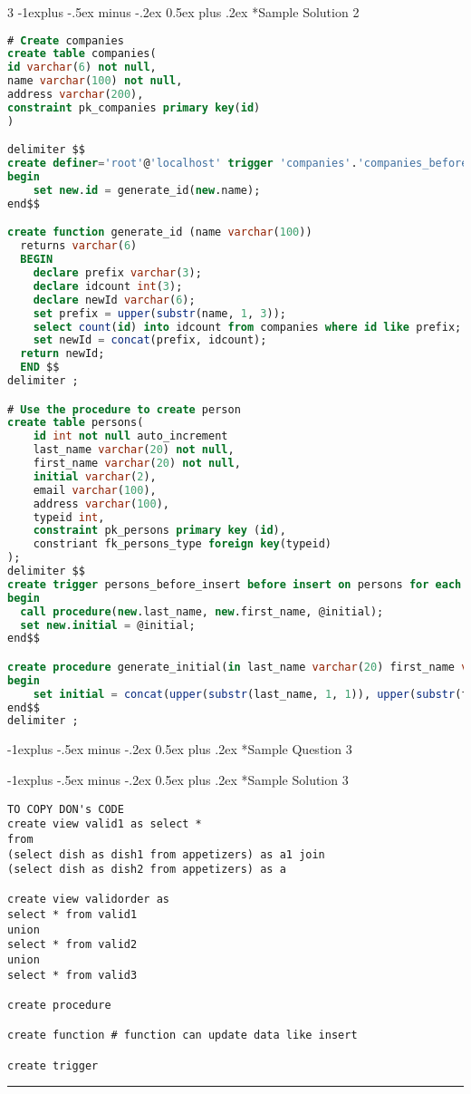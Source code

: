 \documentclass[10pt,landscape]{article}
\makeatletter
\renewcommand{\subsection}{\@startsection{subsection}{2}{0mm}%
                                {-1explus -.5ex minus -.2ex}%
                                {0.5ex plus .2ex}%
                                {\normalfont\normalsize\bfseries}}
\makeatother
\begin{document}
\begin{multicols}{3}
\subsection*{Sample Solution 2}
\begin{lstlisting}[language=SQL]
# Create companies
create table companies(
id varchar(6) not null,
name varchar(100) not null,
address varchar(200),
constraint pk_companies primary key(id)
)

delimiter $$
create definer='root'@'localhost' trigger 'companies'.'companies_before_insert' before insert on companies for each row
begin
	set new.id = generate_id(new.name);
end$$

create function generate_id (name varchar(100))
  returns varchar(6)
  BEGIN
    declare prefix varchar(3);
    declare idcount int(3);
    declare newId varchar(6);
    set prefix = upper(substr(name, 1, 3));
    select count(id) into idcount from companies where id like prefix;
    set newId = concat(prefix, idcount);
  return newId;
  END $$ 
delimiter ;

# Use the procedure to create person
create table persons(
	id int not null auto_increment
    last_name varchar(20) not null,
	first_name varchar(20) not null,
    initial varchar(2),
    email varchar(100),
    address varchar(100),
    typeid int,
    constraint pk_persons primary key (id),
    constriant fk_persons_type foreign key(typeid)
);
delimiter $$
create trigger persons_before_insert before insert on persons for each row
begin
  call procedure(new.last_name, new.first_name, @initial);
  set new.initial = @initial;
end$$

create procedure generate_initial(in last_name varchar(20) first_name varchar(20) ,out initial varchar(2))
begin
	set initial = concat(upper(substr(last_name, 1, 1)), upper(substr(first_name, 1, 1)))
end$$
delimiter ; 

\end{lstlisting}

\subsection*{Sample Question 3}

\subsection*{Sample Solution 3}
\begin{lstlisting}
TO COPY DON's CODE
create view valid1 as select *
from 
(select dish as dish1 from appetizers) as a1 join
(select dish as dish2 from appetizers) as a

create view validorder as
select * from valid1
union
select * from valid2
union 
select * from valid3

create procedure

create function # function can update data like insert

create trigger
\end{lstlisting}


\rule{0.3\linewidth}{0.25pt}
\scriptsize


\end{multicols}
\end{document}
